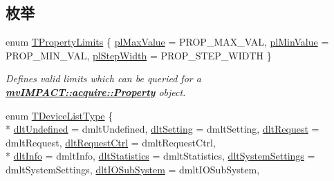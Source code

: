 \subsection*{枚举}
\begin{DoxyCompactItemize}
\item 
enum \hyperlink{group___common_interface_gab31a9721792e36b8c256a769961df4f9}{T\+Property\+Limits} \{ \hyperlink{group___common_interface_ggab31a9721792e36b8c256a769961df4f9ae1741c28905c58c1873e458f994b3d32}{pl\+Max\+Value} = P\+R\+O\+P\+\_\+\+M\+A\+X\+\_\+\+V\+A\+L, 
\hyperlink{group___common_interface_ggab31a9721792e36b8c256a769961df4f9a1f7c627c279e3393bf6bae37b883caf2}{pl\+Min\+Value} = P\+R\+O\+P\+\_\+\+M\+I\+N\+\_\+\+V\+A\+L, 
\hyperlink{group___common_interface_ggab31a9721792e36b8c256a769961df4f9a0b4df6e0f7f4c251d3d7119e3b62beaf}{pl\+Step\+Width} = P\+R\+O\+P\+\_\+\+S\+T\+E\+P\+\_\+\+W\+I\+D\+T\+H
 \}
\begin{DoxyCompactList}\small\item\em Defines valid limits which can be queried for a {\bfseries \hyperlink{classmv_i_m_p_a_c_t_1_1acquire_1_1_property}{mv\+I\+M\+P\+A\+C\+T\+::acquire\+::\+Property}} object. \end{DoxyCompactList}\item 
enum \hyperlink{group___common_interface_ga0dca79bbf0803a4ecec16d6cbb1a3dbb}{T\+Device\+List\+Type} \{ \\*
\hyperlink{group___common_interface_gga0dca79bbf0803a4ecec16d6cbb1a3dbba64656c81b86974fb95dfec65a07cd38e}{dlt\+Undefined} = dmlt\+Undefined, 
\hyperlink{group___common_interface_gga0dca79bbf0803a4ecec16d6cbb1a3dbbaf47a23922dbe8011a3bc439f732e54c5}{dlt\+Setting} = dmlt\+Setting, 
\hyperlink{group___common_interface_gga0dca79bbf0803a4ecec16d6cbb1a3dbbafbeb94d226105486c09f32617b782066}{dlt\+Request} = dmlt\+Request, 
\hyperlink{group___common_interface_gga0dca79bbf0803a4ecec16d6cbb1a3dbba1e9f9f72af83e4dcc782e143fe3545b0}{dlt\+Request\+Ctrl} = dmlt\+Request\+Ctrl, 
\\*
\hyperlink{group___common_interface_gga0dca79bbf0803a4ecec16d6cbb1a3dbba0a723b8a1e1c07ca9f21e0eecc150cf0}{dlt\+Info} = dmlt\+Info, 
\hyperlink{group___common_interface_gga0dca79bbf0803a4ecec16d6cbb1a3dbba73657baf752ee9e431a51ba4b5115ba2}{dlt\+Statistics} = dmlt\+Statistics, 
\hyperlink{group___common_interface_gga0dca79bbf0803a4ecec16d6cbb1a3dbba451b7b4dc17494c9775bc6bdc3fecaa6}{dlt\+System\+Settings} = dmlt\+System\+Settings, 
\hyperlink{group___common_interface_gga0dca79bbf0803a4ecec16d6cbb1a3dbba813278e6d24db6a0cbc7f9aa234a075e}{dlt\+I\+O\+Sub\+System} = dmlt\+I\+O\+Sub\+System, 

\end{DoxyCompactItemize}
